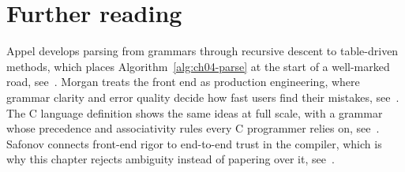\section{Further reading}
\label{sec:ch04-further-reading}

Appel develops parsing from grammars through recursive descent to table-driven methods, which places Algorithm~\ref{alg:ch04-parse} at the start of a well-marked road, see~\cite{appel-1998-modern}.
Morgan treats the front end as production engineering, where grammar clarity and error quality decide how fast users find their mistakes, see~\cite{morgan-1998-optimizing}.
The C language definition shows the same ideas at full scale, with a grammar whose precedence and associativity rules every C programmer relies on, see~\cite{wg14-2011-c11}.
Safonov connects front-end rigor to end-to-end trust in the compiler, which is why this chapter rejects ambiguity instead of papering over it, see~\cite{safonov-2010-trustworthy}.

